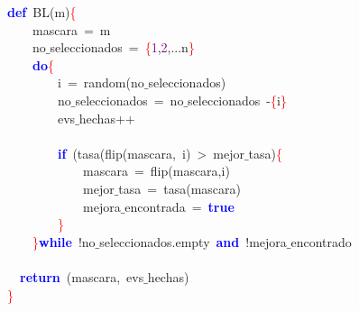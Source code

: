 \noindent
\mbox{}\textbf{\textcolor{Blue}{def}}\ BL\textcolor{BrickRed}{(}m\textcolor{BrickRed}{)}\textcolor{Red}{\{} \\
\mbox{}\ \ \ \ mascara\ \textcolor{BrickRed}{=}\ m \\
\mbox{}\ \ \ \ no$\_$seleccionados\ \textcolor{BrickRed}{=}\ \textcolor{Red}{\{}\textcolor{Purple}{1}\textcolor{BrickRed}{,}\textcolor{Purple}{2}\textcolor{BrickRed}{,...}n\textcolor{Red}{\}} \\
\mbox{}\ \ \ \ \textbf{\textcolor{Blue}{do}}\textcolor{Red}{\{} \\
\mbox{}\ \ \ \ \ \ \ \ i\ \textcolor{BrickRed}{=}\ random\textcolor{BrickRed}{(}no$\_$seleccionados\textcolor{BrickRed}{)} \\
\mbox{}\ \ \ \ \ \ \ \ no$\_$seleccionados\ \textcolor{BrickRed}{=}\ no$\_$seleccionados\ \textcolor{BrickRed}{-}\textcolor{Red}{\{}i\textcolor{Red}{\}} \\
\mbox{}\ \ \ \ \ \ \ \ evs$\_$hechas\textcolor{BrickRed}{++} \\
\mbox{} \\
\mbox{}\ \ \ \ \ \ \ \ \textbf{\textcolor{Blue}{if}}\ \textcolor{BrickRed}{(}tasa\textcolor{BrickRed}{(}flip\textcolor{BrickRed}{(}mascara\textcolor{BrickRed}{,}\ i\textcolor{BrickRed}{)}\ \textcolor{BrickRed}{\textgreater{}}\ mejor$\_$tasa\textcolor{BrickRed}{)}\textcolor{Red}{\{} \\
\mbox{}\ \ \ \ \ \ \ \ \ \ \ \ mascara\ \textcolor{BrickRed}{=}\ flip\textcolor{BrickRed}{(}mascara\textcolor{BrickRed}{,}i\textcolor{BrickRed}{)} \\
\mbox{}\ \ \ \ \ \ \ \ \ \ \ \ mejor$\_$tasa\ \textcolor{BrickRed}{=}\ tasa\textcolor{BrickRed}{(}mascara\textcolor{BrickRed}{)} \\
\mbox{}\ \ \ \ \ \ \ \ \ \ \ \ mejora$\_$encontrada\ \textcolor{BrickRed}{=}\ \textbf{\textcolor{Blue}{true}} \\
\mbox{}\ \ \ \ \ \ \ \ \textcolor{Red}{\}} \\
\mbox{}\ \ \ \ \textcolor{Red}{\}}\textbf{\textcolor{Blue}{while}}\ \textcolor{BrickRed}{!}no$\_$seleccionados\textcolor{BrickRed}{.}empty\ \textbf{\textcolor{Blue}{and}}\ \textcolor{BrickRed}{!}mejora$\_$encontrado \\
\mbox{} \\
\mbox{}\ \ \textbf{\textcolor{Blue}{return}}\ \textcolor{BrickRed}{(}mascara\textcolor{BrickRed}{,}\ evs$\_$hechas\textcolor{BrickRed}{)} \\
\mbox{}\textcolor{Red}{\}} \\
\mbox{}
